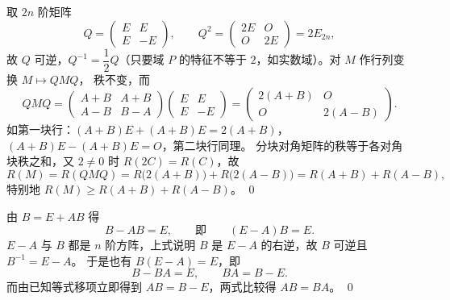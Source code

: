 \begin{solution}
取 $2n$ 阶矩阵
\[
Q=\begin{pmatrix}E&E\\E&-E\end{pmatrix},\qquad
Q^{2}=\begin{pmatrix}2E&O\\O&2E\end{pmatrix}=2E_{2n},
\]
故 $Q$ 可逆，$Q^{-1}=\dfrac12Q$（只要域 $P$ 的特征不等于 $2$，如实数域）。对 $M$ 作行列变换 $M\mapsto QMQ$，
秩不变，而
\[
QMQ=\begin{pmatrix}A+B&A+B\\A-B&B-A\end{pmatrix}\begin{pmatrix}E&E\\E&-E\end{pmatrix}
=\begin{pmatrix}2(A+B)&O\\O&2(A-B)\end{pmatrix}.
\]
如第一块行：$(A+B)E+(A+B)E=2(A+B)$，$(A+B)E-(A+B)E=O$，第二块行同理。
分块对角矩阵的秩等于各对角块秩之和，又 $2\ne0$ 时 $R(2C)=R(C)$，故
\[
R(M)=R(QMQ)=R\bigl(2(A+B)\bigr)+R\bigl(2(A-B)\bigr)=R(A+B)+R(A-B),
\]
特别地 $R(M)\ge R(A+B)+R(A-B)$。
\qed
\end{solution}

\begin{solution}
由 $B=E+AB$ 得
\[
B-AB=E,\qquad\text{即}\qquad (E-A)B=E .
\]
$E-A$ 与 $B$ 都是 $n$ 阶方阵，上式说明 $B$ 是 $E-A$ 的右逆，故 $B$ 可逆且 $B^{-1}=E-A$。
于是也有 $B(E-A)=E$，即
\[
B-BA=E,\qquad BA=B-E .
\]
而由已知等式移项立即得到 $AB=B-E$，两式比较得 $AB=BA$。
\qed
\end{solution}
